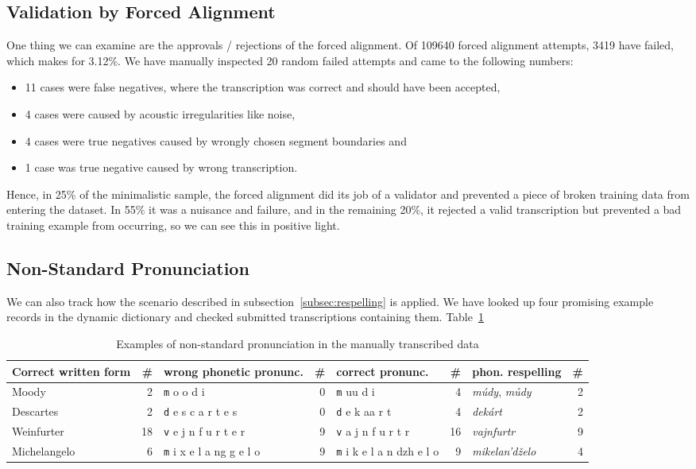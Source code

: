 \documentclass{itatnew}
\begin{document}
\subsection{Validation by Forced Alignment}

One thing we can examine are the approvals / rejections of the forced alignment.
Of 109640 forced alignment attempts, 3419 have failed, which makes for 3.12\%.
We have manually inspected 20 random failed attempts and came to the following
numbers:
\begin{itemize}
\item{
    11 cases were false negatives, where the transcription was correct and
    should have been accepted,
}
\item{
    4 cases were caused by acoustic irregularities like noise,
}
\item{
    4 cases were true negatives caused by wrongly chosen segment boundaries and
}
\item{
    1 case was true negative caused by wrong transcription.
}
\end{itemize}

Hence, in 25\% of the minimalistic sample, the forced alignment did its job of a
validator and prevented a piece of broken training data from entering the
dataset. In 55\% it was a nuisance and failure, and in the remaining 20\%, it
rejected a valid transcription but prevented a bad training example from
occurring, so we can see this in positive light.

\subsection{Non-Standard Pronunciation}

We can also track how the scenario described in
subsection~\ref{subsec:respelling} is applied. We have looked up four promising
example records in the dynamic dictionary and checked submitted transcriptions
containing them. Table~\ref{tab:pronunc}

\begin{table}[htpb]
\begin{center}
\begin{tabular}{|l r|l r|l r|l r|}
\hline
Correct written form        & \#
	& wrong phonetic pronunc.   & \#
		& correct pronunc.          & \#
			& phon. respelling          & \# \\
\hline
Moody & 2 & {\texttt m o o d i} & 0 & {\texttt m uu d i} & 4 & {\em múdy}, {\em můdy} & 2 \\
Descartes & 2 & {\texttt d e s c a r t e s} & 0 & {\texttt d e k aa r t} & 4 & {\em dekárt} & 2   \\
Weinfurter & 18 & {\texttt v e j n f u r t e r} & 9 & {\texttt v a j n f u r t r} & 16 & {\em vajnfurtr} & 9 \\
Michelangelo & 6 & {\texttt m i x e l a ng g e l o} & 9 & {\texttt m i k e l a n dzh e l o} & 9 & {\em mikelan'dželo} & 4 \\
\hline
\end{tabular}
\caption{Examples of non-standard pronunciation in the manually transcribed data}\label{tab:pronunc}
\end{center}
\end{table}
\end{document}
